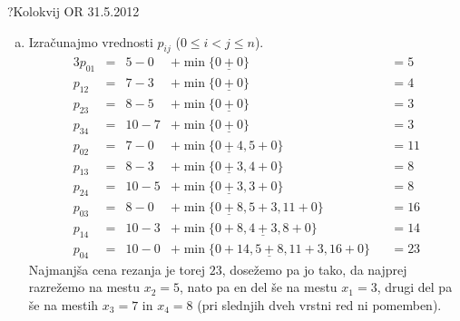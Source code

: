 \begin{naloga}{?}{Kolokvij OR 31.5.2012}
\begin{odgovor}
\begin{enumerate}[(a)]
\item Izračunajmo vrednosti $p_{ij}$ ($0 \le i < j \le n$).
\begin{alignat*}{3}
p_{01} &=&  5 - 0 &+ \min\{\underline{0+0}\} &&= 5 \\
p_{12} &=&  7 - 3 &+ \min\{\underline{0+0}\} &&= 4 \\
p_{23} &=&  8 - 5 &+ \min\{\underline{0+0}\} &&= 3 \\
p_{34} &=& 10 - 7 &+ \min\{\underline{0+0}\} &&= 3 \\
p_{02} &=&  7 - 0 &+ \min\{\underline{0+4}, 5+0\} &&= 11 \\
p_{13} &=&  8 - 3 &+ \min\{\underline{0+3}, 4+0\} &&= 8 \\
p_{24} &=& 10 - 5 &+ \min\{\underline{0+3}, 3+0\} &&= 8 \\
p_{03} &=&  8 - 0 &+ \min\{\underline{0+8}, 5+3, 11+0\} &&= 16 \\
p_{14} &=& 10 - 3 &+ \min\{0+8, \underline{4+3}, 8+0\} &&= 14 \\
p_{04} &=& 10 - 0 &+ \min\{0+14, \underline{5+8}, 11+3, 16+0\} &&= 23
\end{alignat*}
Najmanjša cena rezanja je torej $23$, dosežemo pa jo tako,
da najprej razrežemo na mestu $x_2 = 5$,
nato pa en del še na mestu $x_1 = 3$,
drugi del pa še na mestih $x_3 = 7$ in $x_4 = 8$
(pri slednjih dveh vrstni red ni pomemben).
\end{enumerate}
\end{odgovor}
\end{naloga}

